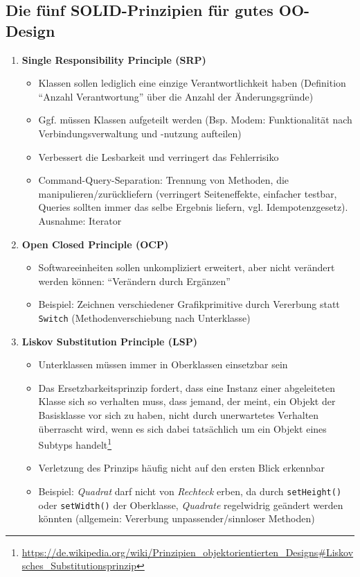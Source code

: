 \subsection{Die fünf SOLID-Prinzipien für gutes OO-Design}
\begin{enumerate}
	\item \textbf{Single Responsibility Principle (SRP)}
	\begin{itemize}
		\item Klassen sollen lediglich eine einzige Verantwortlichkeit haben (Definition "`Anzahl Verantwortung"' über die Anzahl der Änderungsgründe)
		\item Ggf. müssen Klassen aufgeteilt werden (Bsp. Modem: Funktionalität nach Verbindungsverwaltung und -nutzung aufteilen)
		\item Verbessert die Lesbarkeit und verringert das Fehlerrisiko
		\item Command-Query-Separation: Trennung von Methoden, die manipulieren/zurückliefern (verringert Seiteneffekte, einfacher testbar, Queries sollten immer das selbe Ergebnis liefern, vgl. Idempotenzgesetz). Ausnahme: Iterator
	\end{itemize}
	\item \textbf{Open Closed Principle (OCP)}
	\begin{itemize}
		\item Softwareeinheiten sollen unkompliziert erweitert, aber nicht verändert werden können: "`Verändern durch Ergänzen"'
		\item Beispiel: Zeichnen verschiedener Grafikprimitive durch Vererbung statt \texttt{Switch} (Methodenverschiebung nach Unterklasse)
	\end{itemize}
	\item \textbf{Liskov Substitution Principle (LSP)}
	\begin{itemize}
		\item Unterklassen müssen immer in Oberklassen einsetzbar sein
		\item Das Ersetzbarkeitsprinzip fordert, dass eine Instanz einer abgeleiteten Klasse sich so verhalten muss, dass jemand, der meint, ein Objekt der Basisklasse vor sich zu haben, nicht durch unerwartetes Verhalten überrascht wird, wenn es sich dabei tatsächlich um ein Objekt eines Subtyps handelt\footnote{\url{https://de.wikipedia.org/wiki/Prinzipien_objektorientierten_Designs\#Liskovsches_Substitutionsprinzip}}
		\item Verletzung des Prinzips häufig nicht auf den ersten Blick erkennbar
		\item Beispiel: \textit{Quadrat} darf nicht von \textit{Rechteck} erben, da durch \texttt{setHeight()} oder \texttt{setWidth()} der Oberklasse, \textit{Quadrate} regelwidrig geändert werden könnten (allgemein: Vererbung unpassender/sinnloser Methoden)

\end{itemize}
\end{enumerate}
